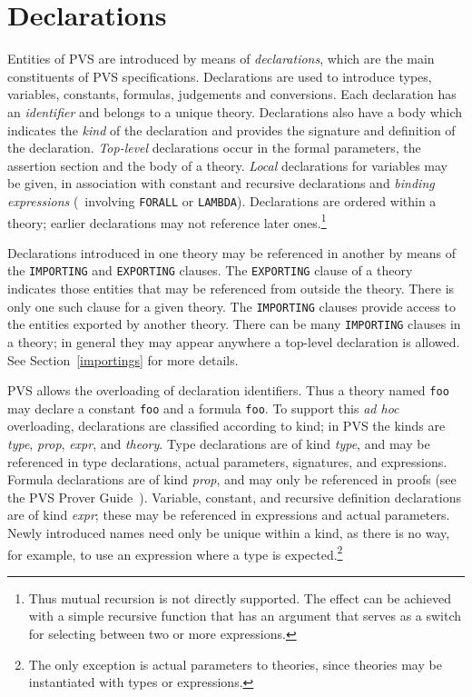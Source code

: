 
\chapter{Declarations}\label{declarations}

Entities of PVS are introduced by means of \emph{declarations}, which are
the main constituents of PVS specifications.  Declarations are used to
introduce types, variables, constants, formulas, judgements and
conversions.  Each declaration has an \emph{identifier} and belongs to a
unique theory.  Declarations also have a body which indicates the
\emph{kind} of the declaration and provides the signature and definition
of the declaration.  \emph{Top-level}
declarations occur in the formal parameters,
the assertion section and the body of a theory.  \emph{Local}
declarations for variables may be given, in
association with constant and recursive declarations and \emph{binding
expressions} (\eg\ involving \texttt{FORALL} or \texttt{LAMBDA}).  Declarations
are ordered within a theory; earlier declarations may not reference later
ones.\footnote{Thus mutual recursion is not directly supported.  The
effect can be achieved with a simple recursive function that has an
argument that serves as a switch for selecting between two or more
expressions.}

 Declarations introduced in one
theory may be referenced in another by means of the \texttt{IMPORTING} and
\texttt{EXPORTING} clauses.  The \texttt{EXPORTING} clause of a theory
indicates those entities that may be referenced from outside the theory.
There is only one such clause for a given theory.  The \texttt{IMPORTING}
clauses provide access to the entities exported by another theory.  There
can be many \texttt{IMPORTING} clauses in a theory; in general they may
appear anywhere a top-level declaration is allowed.  See
Section~\ref{importings} for more details.

PVS allows the overloading of declaration identifiers.
Thus a theory named \texttt{foo} may declare a constant \texttt{foo} and a
formula \texttt{foo}.  To support this \emph{ad hoc} overloading,
declarations are classified according to kind; in
PVS the kinds are \emph{type},
\emph{prop},
\emph{expr}, and
\emph{theory}.  Type declarations are of
kind \emph{type}, and may be referenced in type declarations, actual
parameters, signatures, and expressions.  Formula declarations are of kind
\emph{prop}, and may only be referenced in proofs (see the PVS Prover
Guide~\cite{PVS:prover}).  Variable, constant, and recursive definition
declarations are of kind \emph{expr}; these may be referenced in
expressions and actual parameters.  Newly introduced names need only be
unique within a kind, as there is no way, for example, to use an
expression where a type is expected.\footnote{The only exception is actual
parameters to theories, since theories may be instantiated with types or
expressions.}


